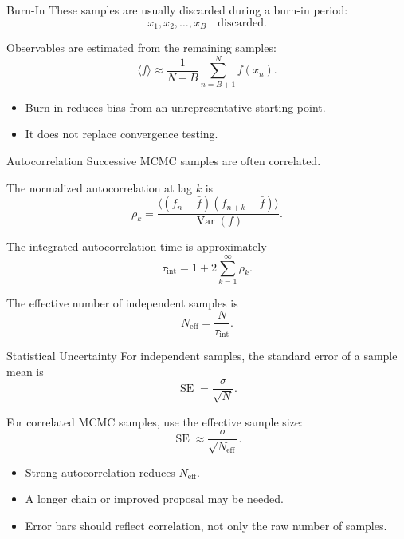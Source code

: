\documentclass[a4paper, 10pt, onepage]{elegantbook}
\begin{document}
{\begin{frame}{Burn-In}
  These samples are usually discarded during a burn-in period:
  \[
    x_1,x_2,\ldots,x_B
    \quad\text{discarded}.
  \]

  Observables are estimated from the remaining samples:
  \[
    \langle f\rangle
    \approx
    \frac{1}{N-B}
    \sum_{n=B+1}^{N}f(x_n).
  \]

  \begin{itemize}
    \item Burn-in reduces bias from an unrepresentative starting point.
    \item It does not replace convergence testing.
  \end{itemize}
\end{frame}

\begin{frame}{Autocorrelation}
  Successive MCMC samples are often correlated.

  The normalized autocorrelation at lag \(k\) is
  \[
    \rho_k
    =
    \frac{
      \langle(f_n-\bar f)(f_{n+k}-\bar f)\rangle
    }{
      \operatorname{Var}(f)
    }.
  \]

  The integrated autocorrelation time is approximately
  \[
    \tau_{\mathrm{int}}
    =
    1+2\sum_{k=1}^{\infty}\rho_k.
  \]

  The effective number of independent samples is
  \[
    N_{\mathrm{eff}}
    =
    \frac{N}{\tau_{\mathrm{int}}}.
  \]
\end{frame}

\begin{frame}{Statistical Uncertainty}
  For independent samples, the standard error of a sample mean is
  \[
    \operatorname{SE}
    =
    \frac{\sigma}{\sqrt{N}}.
  \]

  For correlated MCMC samples, use the effective sample size:
  \[
    \operatorname{SE}
    \approx
    \frac{\sigma}{\sqrt{N_{\mathrm{eff}}}}.
  \]

  \begin{itemize}
    \item Strong autocorrelation reduces \(N_{\mathrm{eff}}\).
    \item A longer chain or improved proposal may be needed.
    \item Error bars should reflect correlation, not only the raw number of samples.
  \end{itemize}
\end{frame}

}
\end{document}
